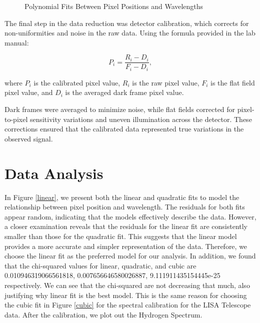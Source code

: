 \documentclass[10pt, preprint]{aastex}
\begin{document}
\begin{figure}[H]
  \centering
  \hfill
  \caption{\label{fig:y}Polynomial Fits Between Pixel Positions and Wavelengths}
\end{figure}

The final step in the data reduction was detector calibration, which corrects for non-uniformities and noise in the raw data. Using the formula provided in the lab manual:

\[
P_i = \frac{R_i - D_i}{F_i - D_i},
\]

where \( P_i \) is the calibrated pixel value, \( R_i \) is the raw pixel value, \( F_i \) is the flat field pixel value, and \( D_i \) is the averaged dark frame pixel value\cite{labmanual3}.

Dark frames were averaged to minimize noise, while flat fields corrected for pixel-to-pixel sensitivity variations and uneven illumination across the detector. These corrections ensured that the calibrated data represented true variations in the observed signal.

\section{Data Analysis}\label{sec:analysis}

In Figure \ref{linear}, we present both the linear and quadratic fits to model the relationship between pixel position and wavelength. The residuals for both fits appear random, indicating that the models effectively describe the data. However, a closer examination reveals that the residuals for the linear fit are consistently smaller than those for the quadratic fit. This suggests that the linear model provides a more accurate and simpler representation of the data. Therefore, we choose the linear fit as the preferred model for our analysis. In addition, we found that the chi-squared values for linear, quadratic, and cubic are 0.010946319066561818, 0.007656646580026887, 9.111911435154445e-25 respectively. We can see that the chi-squared are not decreasing that much, also justifying why linear fit is the best model. This is the same reason for choosing the cubic fit in Figure \ref{cubic} for the spectral calibration for the LISA Telescope data. After the calibration, we plot out the Hydrogen Spectrum.
\end{document}
